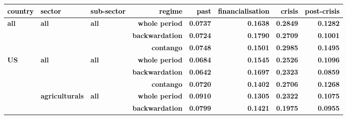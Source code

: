 \documentclass[
  authoryear,
  preprint,
  3p]{elsarticle}
\begin{document}
\begin{longtable}[t]{>{}l>{}l>{}l>{}r>{}r>{}r>{}r>{}r}
\toprule
\textcolor{black}{\textbf{country}} & \textcolor{black}{\textbf{sector}} & \textcolor{black}{\textbf{sub-sector}} & \textcolor{black}{\textbf{regime}} & \textcolor{black}{\textbf{past}} & \textcolor{black}{\textbf{financialisation}} & \textcolor{black}{\textbf{crisis}} & \textcolor{black}{\textbf{post-crisis}}\\
\midrule
\textbf{all} & \textbf{all} & \textbf{all} & \textbf{whole period} & \textcolor[HTML]{4285f4}{\textbf{0.0737}} & \textcolor[HTML]{4285f4}{\textbf{0.1638}} & \textcolor[HTML]{4285f4}{\textbf{0.2849}} & \textcolor[HTML]{4285f4}{\textbf{0.1282}}\\
\textbf{} & \textbf{} & \textbf{} & \textbf{backwardation} & \textcolor[HTML]{4285f4}{\textbf{0.0724}} & \textcolor[HTML]{4285f4}{\textbf{0.1790}} & \textcolor[HTML]{4285f4}{\textbf{0.2709}} & \textcolor[HTML]{4285f4}{\textbf{0.1001}}\\
\textbf{} & \textbf{} & \textbf{} & \textbf{contango} & \textcolor[HTML]{4285f4}{\textbf{0.0748}} & \textcolor[HTML]{4285f4}{\textbf{0.1501}} & \textcolor[HTML]{4285f4}{\textbf{0.2985}} & \textcolor[HTML]{4285f4}{\textbf{0.1495}}\\
\textbf{US} & \textbf{all} & \textbf{all} & \textbf{whole period} & \textcolor[HTML]{4285f4}{\textbf{0.0684}} & \textcolor[HTML]{4285f4}{\textbf{0.1545}} & \textcolor[HTML]{4285f4}{\textbf{0.2526}} & \textcolor[HTML]{4285f4}{\textbf{0.1096}}\\
\textbf{} & \textbf{} & \textbf{} & \textbf{backwardation} & \textcolor[HTML]{4285f4}{\textbf{0.0642}} & \textcolor[HTML]{4285f4}{\textbf{0.1697}} & \textcolor[HTML]{4285f4}{\textbf{0.2323}} & \textcolor[HTML]{4285f4}{\textbf{0.0859}}\\
\addlinespace
\textbf{} & \textbf{} & \textbf{} & \textbf{contango} & \textcolor[HTML]{4285f4}{\textbf{0.0720}} & \textcolor[HTML]{4285f4}{\textbf{0.1402}} & \textcolor[HTML]{4285f4}{\textbf{0.2706}} & \textcolor[HTML]{4285f4}{\textbf{0.1268}}\\
\textbf{} & \textbf{agriculturals} & \textbf{all} & \textbf{whole period} & \textcolor[HTML]{4285f4}{\textbf{0.0910}} & \textcolor[HTML]{4285f4}{\textbf{0.1305}} & \textcolor[HTML]{4285f4}{\textbf{0.2322}} & \textcolor[HTML]{4285f4}{\textbf{0.1075}}\\
\textbf{} & \textbf{} & \textbf{} & \textbf{backwardation} & \textcolor[HTML]{4285f4}{\textbf{0.0799}} & \textcolor[HTML]{4285f4}{\textbf{0.1421}} & \textcolor[HTML]{4285f4}{\textbf{0.1975}} & \textcolor[HTML]{4285f4}{\textbf{0.0955}}\\

\end{longtable}
\end{document}
